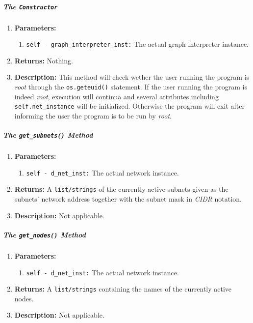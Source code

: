     \subparagraph{The \texttt{Constructor}}
        \begin{enumerate}
            \item \textbf{Parameters:}
            \begin{enumerate}
                \item \texttt{self - graph\_interpreter\_inst:} The actual graph interpreter instance.
            \end{enumerate}
            \item \textbf{Returns:} Nothing.
            \item \textbf{Description:} This method will check wether the user running the program is \textit{root} through the \texttt{os.geteuid()} statement. If the user running the program is indeed \textit{root}, execution will continua and several attributes including \texttt{self.net\_instance} will be initialized. Otherwise the program will exit after informing the user the program is to be run by \textit{root}.
        \end{enumerate}

    \subparagraph{The \texttt{get\_subnets()} Method}
        \begin{enumerate}
            \item \textbf{Parameters:}
            \begin{enumerate}
                \item \texttt{self - d\_net\_inst:} The actual network instance.
            \end{enumerate}
            \item \textbf{Returns:} A \texttt{list/strings} of the currently active subnets given as the subnets' network address together with the subnet mask in \textit{CIDR} notation.
            \item \textbf{Description:} Not applicable.
        \end{enumerate}

    \subparagraph{The \texttt{get\_nodes()} Method}
        \begin{enumerate}
            \item \textbf{Parameters:}
            \begin{enumerate}
                \item \texttt{self - d\_net\_inst:} The actual network instance.
            \end{enumerate}
            \item \textbf{Returns:} A \texttt{list/strings} containing the names of the currently active nodes.
            \item \textbf{Description:} Not applicable.
        \end{enumerate}


